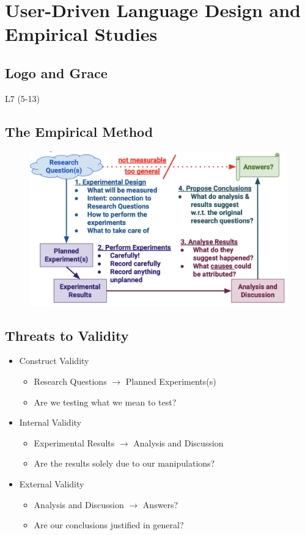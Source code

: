 \documentclass{article}
\begin{document}
\section{User-Driven Language Design and Empirical Studies}

\subsection{Logo and Grace}

L7 (5-13)

\subsection{The Empirical Method}

\begin{figure}[H]
    \centering
    \includegraphics[width=\textwidth]{the_empirical_method}
\end{figure}

\subsection{Threats to Validity}

\begin{itemize}
    \item Construct Validity
    \begin{itemize}
        \item Research Questions $\rightarrow$ Planned Experiments(s)
        \item Are we testing what we mean to test?
    \end{itemize}
    \item Internal Validity
    \begin{itemize}
        \item Experimental Results $\rightarrow$ Analysis and Discussion
        \item Are the results solely due to our manipulations?
    \end{itemize}
    \item External Validity
    \begin{itemize}
        \item Analysis and Discussion $\rightarrow$ Answers?
        \item Are our conclusions justiﬁed in general?
    \end{itemize}
\end{itemize}
\end{document}
